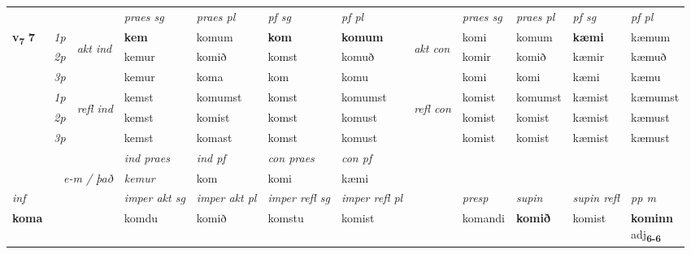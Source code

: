 \begin{longtable}[l]{X>{\footnotesize\itshape}llXXXXlXXXX}
 & &   & \textit{praes sg}  & \textit{praes pl}    & \textit{ pf sg} & \textit{pf pl} & & \textit{praes sg}  & \textit{praes pl}    & \textit{pf sg} & \textit{pf pl }  \\ \cmidrule{4-7} \cmidrule{9-12}
 \multirow{2}{*}{{{\textbf{v{\textsubscript{7}}} \Large{\textbf{7}}}}}  & 1p & \multirow{3}{*}{\begin{turn}{90}\textit{akt ind}\end{turn}} & \textbf{kem} & komum & \textbf{kom} & \textbf{komum} & \multirow{3}{*}{\begin{turn}{90}\textit{akt con}\end{turn}} &komi & komum & \textbf{kæmi} & kæmum\\*
 & 2p &  &  kemur  & komið & komst & komuð & & komir & komið & kæmir & kæmuð \\*
 & 3p &  & kemur & koma & kom & komu & & komi & komi& kæmi & kæmu \\*
\cmidrule{4-7} \cmidrule{9-12}
 & 1p & \multirow{3}{*}{\begin{turn}{90}\textit{refl ind}\end{turn}}  & kemst & komumst & komst & komumst & \multirow{3}{*}{\begin{turn}{90}\textit{refl con}\end{turn}}  &komist & komumst & kæmist & kæmumst \\*
 & 2p &  & kemst & komist & komst & komust & &komist & komist & kæmist & kæmust \\*
 & 3p  & & kemst & komast & komst & komust & & komist & komist& kæmist & kæmust \\*
\cmidrule{4-7} \cmidrule{9-12}

   && &  \textit{ind praes} & \textit{ind pf} & \textit{con praes} & \textit{con pf} \\*
\multicolumn{3}{r}{\textit{e-m / það}} & kemur & kom & komi & kæmi \\*

\cmidrule{4-7}
   {\textit{inf}} & &  & \textit{imper akt sg} & \textit{imper akt pl} & \textit{imper refl sg} & \textit{imper refl pl} && \textit{presp} & \textit{supin} & \textit{supin refl} & \textit{pp m} \\*
  {\textbf{koma}} & && komdu  & komið & komstu & komist && komandi &  \textbf{komið} & komist & \specialcell{\textbf{kominn} \\ adj\textbf{\textsubscript{6-6}}} \\*

\midrule


\end{longtable}
